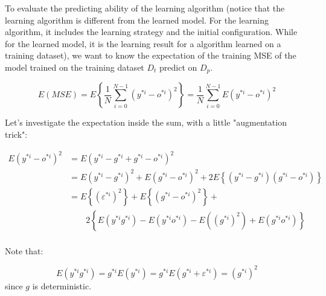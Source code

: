 \documentclass[runningheads,openany]{xhlPaper}
\begin{document}
To evaluate the predicting ability of the learning algorithm (notice that the learning algorithm is different from the learned model. For the learning algorithm, it includes the learning strategy and the initial configuration. While for the learned model, it is the learning result for a algorithm learned on a training dataset), we want to know the expectation of the training MSE of the model trained on the training dataset $D_t$ predict on $D_p$.


\begin{displaymath}
E\left ( MSE \right )=E\left \{ \frac{1}{N} {\sum_{i=0}^{N-1}\left ( y^{*i}-o^{*i} \right )^2}\right \}
=\frac{1}{N}{\sum_{i=0}^{N-1}{E\left ( y^{*i}-o^{*i} \right )^2}}
\end{displaymath}

Let's investigate the expectation inside the sum, with a little "augmentation trick":

\begin{displaymath}
\begin{aligned}
E\left ( y^{*i}-o^{*i} \right )^2&=E\left ( y^{*i}-g^{*i}+g^{*i}-o^{*i} \right )^2\\
&=E\left ( y^{*i}-g^{*i} \right )^2+E\left ( g^{*i}-o^{*i} \right )^2+2E\left \{ \left ( y^{*i}-g^{*i} \right )\left ( g^{*i}-o^{*i} \right )\right \}\\
&=E\left \{ \left(\varepsilon^{*i}\right)^2  \right \}+E\left \{\left ( g^{*i}-o^{*i} \right )^2\right \}+\\
&\quad\quad 2\left \{ E\left ( y^{*i}g^{*i} \right ) -E\left ( y^{*i}o^{*i} \right )-E\left ( \left ( g^{*i} \right )^2 \right ) +E\left ( g^{*i}o^{*i} \right )\right \}
\\
\end{aligned}
\end{displaymath}

Note that:

\begin{displaymath}
E\left ( y^{*i}g^{*i} \right )=g^{*i}E\left ( y^{*i} \right )=g^{*i}E\left ( g^{*i}+\varepsilon^{*i}  \right )=\left ( g^{*i} \right )^2
\end{displaymath}
since $g$ is deterministic.
\end{document}
